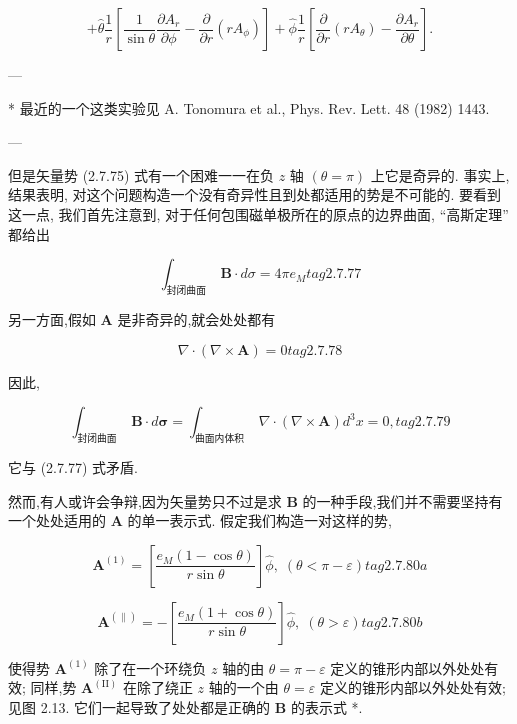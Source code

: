 \documentclass[lang=cn,newtx,10pt,scheme=chinese,thmcnt=section]{elegantbook}
\begin{document}
$$
+ \widehat{\theta }\frac{1}{r}\left\lbrack {\frac{1}{\sin \theta }\frac{\partial {A}_{r}}{\partial \phi } - \frac{\partial }{\partial r}\left( {r{A}_{\phi }}\right) }\right\rbrack + \widehat{\phi }\frac{1}{r}\left\lbrack {\frac{\partial }{\partial r}\left( {r{A}_{\theta }}\right) - \frac{\partial {A}_{r}}{\partial \theta }}\right\rbrack .
$$

---

* 最近的一个这类实验见 A. Tonomura et al., Phys. Rev. Lett. 48 (1982) 1443.

---

但是矢量势 (2.7.75) 式有一个困难一一在负 $z$ 轴 $\left( {\theta = \pi }\right)$ 上它是奇异的. 事实上,结果表明, 对这个问题构造一个没有奇异性且到处都适用的势是不可能的. 要看到这一点, 我们首先注意到, 对于任何包围磁单极所在的原点的边界曲面, “高斯定理” 都给出

$$
{\int }_{\text{封闭曲面 }}\mathbf{B} \cdot {d\sigma } = {4\pi }{e}_{M} tag{2.7.77}
$$

另一方面,假如 $\mathbf{A}$ 是非奇异的,就会处处都有

$$
\nabla \cdot \left( {\nabla \times \mathbf{A}}\right) = 0 tag{2.7.78}
$$

因此,

$$
{\int }_{\text{封闭曲面 }}\mathbf{B} \cdot d\mathbf{\sigma } = {\int }_{\text{曲面内体积 }}\nabla \cdot \left( {\nabla \times \mathbf{A}}\right) {d}^{3}x = 0, tag{2.7.79}
$$

它与 (2.7.77) 式矛盾.

然而,有人或许会争辩,因为矢量势只不过是求 $\mathbf{B}$ 的一种手段,我们并不需要坚持有一个处处适用的 $\mathbf{A}$ 的单一表示式. 假定我们构造一对这样的势,

$$
{\mathbf{A}}^{\left( 1\right) } = \left\lbrack \frac{{e}_{M}\left( {1 - \cos \theta }\right) }{r\sin \theta }\right\rbrack \widehat{\phi },\;\left( {\theta < \pi - \varepsilon }\right) tag{2. 7.80a}
$$

$$
{\mathbf{A}}^{\left( \parallel \right) } = - \left\lbrack \frac{{e}_{M}\left( {1 + \cos \theta }\right) }{r\sin \theta }\right\rbrack \widehat{\phi },\;\left( {\theta > \varepsilon }\right) tag{2. 7.80b}
$$

使得势 ${\mathbf{A}}^{\left( 1\right) }$ 除了在一个环绕负 $z$ 轴的由 $\theta = \pi - \varepsilon$ 定义的锥形内部以外处处有效; 同样,势 ${\mathbf{A}}^{\left( \mathrm{{II}}\right) }$ 在除了绕正 $z$ 轴的一个由 $\theta = \varepsilon$ 定义的锥形内部以外处处有效; 见图 2.13. 它们一起导致了处处都是正确的 $\mathbf{B}$ 的表示式 *.
\end{document}
